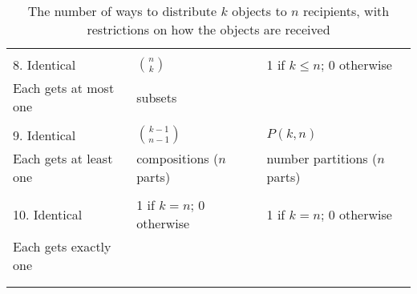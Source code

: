 \documentclass[10pt,]{book}
\theoremstyle{plain}
\theoremstyle{definition}
\numberwithin{equation}{chapter}
\newcommand{\hrulethin}  {\noalign{\hrule height 0.04em}}
\begin{document}
\begin{table}
\begin{tabular}{lll}
&&\tabularnewline\hrulethin
8.  Identical&\(\binom{n}{k}\)&1 if \(k\le n\); 0 otherwise\tabularnewline[0pt]
Each gets at most one&subsets&\tabularnewline[0pt]
&&\tabularnewline\hrulethin
9.  Identical&\(\binom{k-1}{n-1}\)&\(P(k,n)\)\tabularnewline[0pt]
Each gets at least one&compositions (\(n\) parts)&number partitions (\(n\) parts)\tabularnewline[0pt]
&&\tabularnewline\hrulethin
10.  Identical&1 if \(k=n\); 0 otherwise&1 if \(k=n\); 0 otherwise\tabularnewline[0pt]
Each gets exactly one&&\tabularnewline[0pt]
&&\tabularnewline\hrulethin
\end{tabular}
\caption{The number of ways to distribute \(k\) objects to \(n\) recipients, with restrictions on how the objects are received\label{lastdistributiontable}}
\end{table}
\typeout{************************************************}
\typeout{************************************************}
\end{document}
